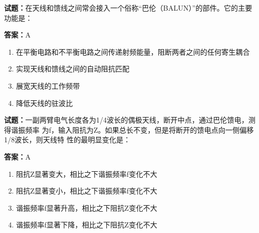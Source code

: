 \documentclass{ctexbook}
\begin{document}




\vspace{1em}

\textbf{试题：}在天线和馈线之间常会接入一个俗称“巴伦（BALUN）”的部件。它的主要功能是： 


\textbf{答案：}A 

\begin{enumerate}[leftmargin=3em]
  \item 在平衡电路和不平衡电路之间传递射频能量，阻断两者之间的任何寄生耦合 

  \item 实现天线和馈线之间的自动阻抗匹配 

  \item 展宽天线的工作频带 

  \item 降低天线的驻波比 

\end{enumerate}





\vspace{1em}

\textbf{试题：}一副两臂电气长度各为1/4波长的偶极天线，断开中点，通过巴伦馈电，测得谐振频率
为f，输入阻抗为Z。如果总长不变，但是将断开的馈电点向一侧偏移1/8波长，则天线特
性的最明显变化是： 

\textbf{答案：}A 

\begin{enumerate}[leftmargin=3em]
  \item 阻抗Z显著变大，相比之下谐振频率f变化不大 

  \item 阻抗Z显著变小，相比之下谐振频率f变化不大 

  \item 谐振频率f显著升高，相比之下阻抗Z变化不大 

  \item 谐振频率f显著下降，相比之下阻抗Z变化不大 

\end{enumerate}





\vspace{1em}
\end{document}

